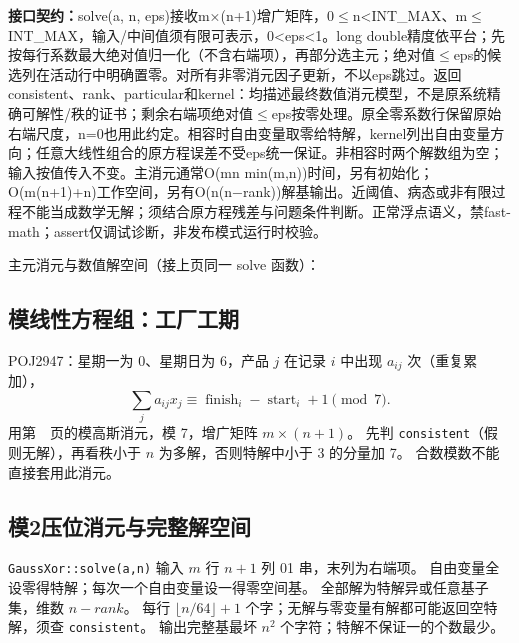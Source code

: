 {\sloppy{}\noindent\textbf{接口契约：}solve(a, n, eps)接收m×(n+1)增广矩阵，0$\le$n<INT\_MAX、m$\le$INT\_MAX，输入/中间值须有限可表示，0<eps<1。long double精度依平台；先按每行系数最大绝对值归一化（不含右端项），再部分选主元；绝对值$\le$eps的候选列在活动行中明确置零。对所有非零消元因子更新，不以eps跳过。返回consistent、rank、particular和kernel：均描述最终数值消元模型，不是原系统精确可解性/秩的证书；剩余右端项绝对值$\le$eps按零处理。原全零系数行保留原始右端尺度，n=0也用此约定。相容时自由变量取零给特解，kernel列出自由变量方向；任意大线性组合的原方程误差不受eps统一保证。非相容时两个解数组为空；输入按值传入不变。主消元通常O(mn min(m,n))时间，另有初始化；O(m(n+1)+n)工作空间，另有O(n(n−rank))解基输出。近阈值、病态或非有限过程不能当成数学无解；须结合原方程残差与问题条件判断。正常浮点语义，禁fast-math；assert仅调试诊断，非发布模式运行时校验。\par}

\Needspace{506pt}



\newpage

\noindent 主元消元与数值解空间（接上页同一 solve 函数）：



\subsection{模线性方程组：工厂工期}\label{knowledge-widget-gauss}
POJ2947：星期一为 0、星期日为 6，产品 $j$ 在记录 $i$ 中出现 $a_{ij}$ 次（重复累加），
\[
\sum_j a_{ij}x_j\equiv \operatorname{finish}_i-\operatorname{start}_i+1\pmod7.
\]
用第~\pageref{compact-GaussMod}~页的模高斯消元，模 7，增广矩阵 $m\times(n+1)$。
先判 \texttt{consistent}（假则无解），再看秩小于 $n$ 为多解，否则特解中小于 3 的分量加 7。
合数模数不能直接套用此消元。



\subsection{模2压位消元与完整解空间}\label{knowledge-gauss-xor}
\texttt{GaussXor::solve(a,n)} 输入 $m$ 行 $n+1$ 列 01 串，末列为右端项。
自由变量全设零得特解；每次一个自由变量设一得零空间基。
全部解为特解异或任意基子集，维数 $n-rank$。
每行 $\lfloor n/64\rfloor+1$ 个字；无解与零变量有解都可能返回空特解，须查 \texttt{consistent}。
输出完整基最坏 $n^2$ 个字符；特解不保证一的个数最少。


